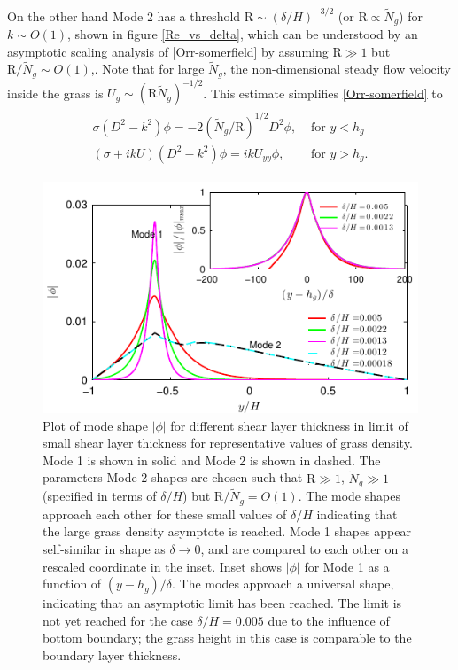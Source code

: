 \documentclass[aps,prl,twocolumn,superscriptaddress,10pt]{revtex4-1}  %
\newcommand{\hg}{h_g}
\newcommand{\Rey}{\text{R}}
\newcommand{\Ndg}{\tilde{N}_g}
\begin{document}
On the other hand Mode 2 has a threshold $\Rey \sim ({\delta}/{H})^{-3/2}$ (or $\Rey \propto \Ndg$) for $k\sim O(1)$, shown in figure \ref{Re_vs_delta}, which can be understood by an asymptotic scaling analysis of \eqref{Orr-somerfield} by assuming $\Rey \gg 1$ but $\Rey/\Ndg \sim O(1)$,.
Note that for large $\Ndg$, the non-dimensional steady flow velocity inside the grass is $U_g \sim (\Rey \Ndg)^{-1/2}$. 
This estimate simplifies \eqref{Orr-somerfield} to 
\begin{align}
\begin{split}
\sigma\left(D^2-k^2\right)\phi = -2{(\Ndg/\Rey)^{1/2}}D^2\phi,   &\text{ for $y<\hg$}  \\
\left(\sigma+ikU\right) \left(D^2-k^2\right)\phi =  ikU_{yy}\phi, &\text{ for $y>\hg$}.
\end{split}
\end{align}
\begin{figure}
\includegraphics[]{Asymptotic_noshear}
\caption{Plot of mode shape $|\phi|$ for different shear layer thickness in limit of small shear layer thickness for representative values of grass density. 
Mode 1 is shown in solid and Mode 2 is shown in dashed. The parameters Mode 2 shapes are chosen such that $\Rey \gg 1$, $\Ndg \gg 1$ (specified in terms of $\delta/H$) but $\Rey/\Ndg = O(1)$. 
The mode shapes approach each other for these small values of $\delta/H$ indicating that the large grass density asymptote is reached. Mode 1 shapes appear self-similar in shape as $\delta\to 0$, 
and are compared to each other on a rescaled coordinate in the inset. 
Inset shows $|\phi|$ for Mode 1 as a function of $(y-\hg)/\delta$. The modes approach a universal shape, indicating that an asymptotic limit has been reached. 
The limit is not yet reached for the case $\delta/H = 0.005$ due to the influence of bottom boundary; the grass height in this case is comparable to the boundary layer thickness.}
\label{Asymptotic_mode}
\end{figure}
\end{document}
